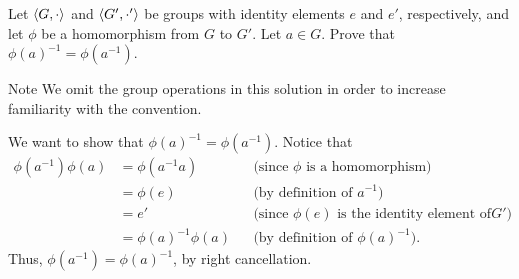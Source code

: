 \begin{exercise}[ID=3E,subtitle=(Extra Credit)]
 Let $\langle G,\cdot\rangle$ and $\langle G',\cdot'\rangle$ be groups with identity elements $e$ and $e'$, respectively, and let $\phi$ be a homomorphism from $G$ to $G'$. Let $a\in G$. Prove that $\phi(a)^{-1}=\phi(a^{-1})$.

\end{exercise}

\begin{solution}[print=true]

\begin{df}{Note}
We  omit the group operations in this solution in order to increase familiarity with the convention.\end{df}

We want to show that $\phi(a)^{-1}=\phi(a^{-1})$.
    Notice that
\begin{align*}
\phi(a^{-1})\phi(a)&=\phi(a^{-1}a)&&\text{(since $\phi$ is a homomorphism)}\\
&=\phi(e)&&\text{(by definition of $a^{-1}$)}\\
&=e'&& \text{(since $\phi(e)$ is the identity element of
$G'$)}\\
&=\phi(a)^{-1}\phi(a)&&\text{(by definition of $\phi(a)^{-1}$)}.
\end{align*}
Thus, $\phi(a^{-1})=\phi(a)^{-1}$, by right cancellation.
\end{solution} 